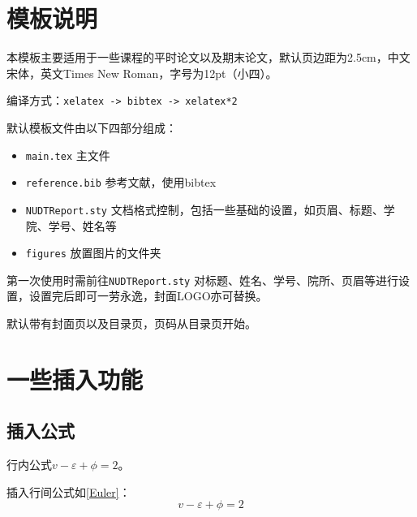 \documentclass[12pt,hyperref,a4paper,UTF8,fontset=fandol]{ctexart}
\begin{document}
\cover

%
%

\thispagestyle{empty} %

\newpage
\tableofcontents

\newpage


\section{模板说明}
本模板主要适用于一些课程的平时论文以及期末论文，默认页边距为2.5cm，中文宋体，英文Times New Roman，字号为12pt（小四）。

编译方式：\verb|xelatex -> bibtex -> xelatex*2|


默认模板文件由以下四部分组成：
\begin{itemize}
    \item \texttt{main.tex} 主文件
    \item \texttt{reference.bib} 参考文献，使用bibtex
    \item \texttt{NUDTReport.sty} 文档格式控制，包括一些基础的设置，如页眉、标题、学院、学号、姓名等
    \item \texttt{figures} 放置图片的文件夹
\end{itemize}

第一次使用时需前往\texttt{NUDTReport.sty} 对标题、姓名、学号、院所、页眉等进行设置，设置完后即可一劳永逸，封面LOGO亦可替换。

默认带有封面页以及目录页，页码从目录页开始。

\section{一些插入功能}
\subsection{插入公式}
行内公式$v-\varepsilon+\phi=2$。

插入行间公式如\autoref{Euler}：
\begin{equation}
    v-\varepsilon+\phi=2
    \label{Euler}
\end{equation}
\end{document}
